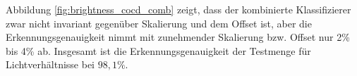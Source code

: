 \newline
\newline
Abbildung \ref{fig:brightness_cocd_comb} zeigt, dass der kombinierte Klassifizierer zwar nicht invariant gegenüber Skalierung und dem Offset ist, aber die Erkennungsgenauigkeit nimmt mit zunehmender
Skalierung bzw. Offset nur 2\% bis 4\% ab. Insgesamt ist die Erkennungsgenauigkeit der Testmenge für Lichtverhältnisse bei $98,1\%$.
